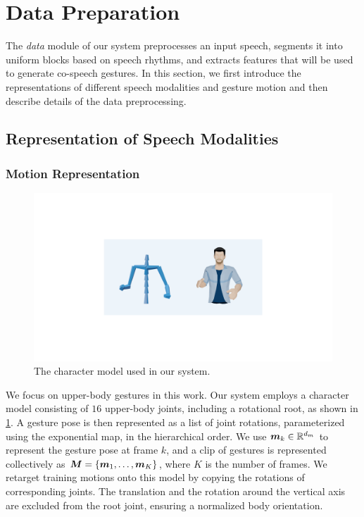 \section{Data Preparation}
\label{sec:data_preparation}
The \emph{data} module of our system preprocesses an input speech, segments it into uniform blocks based on speech rhythms, and extracts features that will be used to generate co-speech gestures. In this section, we first introduce the representations of different speech modalities and gesture motion and then describe details of the data preprocessing.

\subsection{Representation of Speech Modalities}

\subsubsection{Motion Representation}
%
\begin{figure}[t]
    \centering
    \includegraphics[width=0.9\linewidth]{figures/skeleton.pdf}
    \caption{The character model used in our system.}
    \Description{}
    \label{fig:character_model}
\end{figure}
%
We focus on upper-body gestures in this work. Our system employs a character model consisting of $16$ upper-body joints, including a rotational root, as shown in \fig\ref{fig:character_model}. A gesture pose is then represented as a list of joint rotations, parameterized using the exponential map, in the hierarchical order. We use $\bm{m}_k\in\mathbb{R}^{d_m}$ to represent the gesture pose at frame $k$, and a clip of gestures is  represented collectively as $\bm{M}=\{\bm{m}_1,\dots,\bm{m}_K\}$, where $K$ is the number of frames. We retarget training motions onto this model by copying the rotations of corresponding joints. The translation and the rotation around the vertical axis are excluded from the root joint, ensuring a normalized body orientation.

